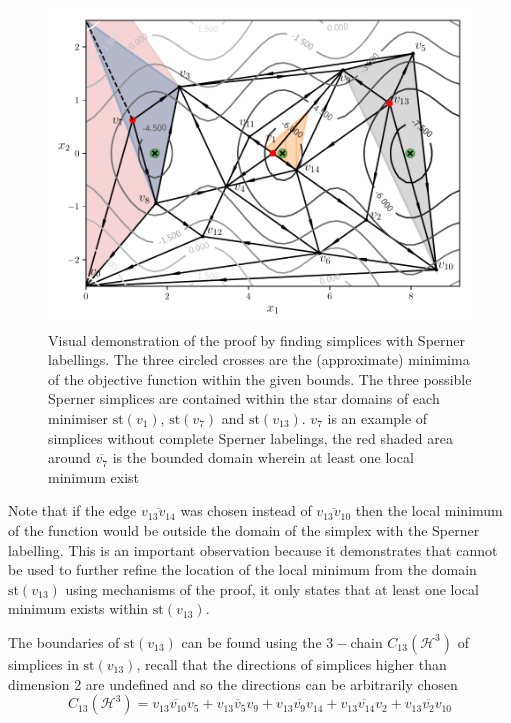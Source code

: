 \begin{figure}
\centerline{\includegraphics[scale=1.0]{./Fig9.pdf}}
{\caption{Visual demonstration of the proof by finding simplices with Sperner labellings. The three circled crosses are the (approximate) minimima of the objective function within the given bounds. The three possible Sperner simplices are contained within the star domains of each minimiser $\textrm{st}\left(v_{1}\right)$, $\textrm{st}\left(v_{7}\right)$ and $\textrm{st}\left(v_{13}\right)$. $v_{7}$ is an example of simplices without complete Sperner labelings, the red shaded area around $\overline{v_7}$ is the bounded domain wherein at least one local minimum exist
} \label{fig:Sperner}} 
\end{figure}

Note that if the edge $\overline{v_{13} v_{14}}$ was chosen instead of $\overline{v_{13}  v_{10}}$ then the local minimum of the function would be outside the domain of the simplex with the Sperner labelling. This is an important observation because it demonstrates that  cannot be used to further refine the location of the local minimum from the domain $\textrm{st}\left(v_{13}\right)$ using mechanisms of the proof, it only states that at least one local minimum exists within $\textrm{st}\left(v_{13}\right)$.

The boundaries of $\textrm{st}\left(v_{13}\right)$ can be found using the $3-$chain $C_{13}(\mathcal{H}^3)$ of simplices in $\textrm{st}\left( v_{13} \right)$, recall that the directions of simplices higher than dimension 2 are undefined and so the directions can be arbitrarily chosen $$C_{13}(\mathcal{H}^3) = \overline{v_{13} v_{10} v_{5}} + \overline{v_{13} v_{5} v_{9}} + \overline{v_{13} v_{9} v_{14}} + \overline{v_{13} v_{14} v_{2}} + \overline{v_{13} v_{2} v_{10}}$$

